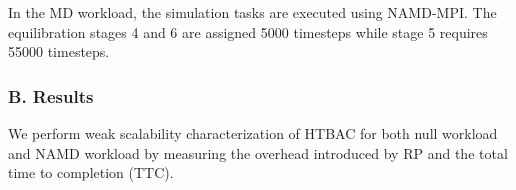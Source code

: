 In the MD workload, the simulation tasks are executed using NAMD-MPI. The equilibration stages 4 and 6 are assigned 5000 timesteps while stage 5 requires 55000 timesteps. 

\subsubsection{B. Results}

We perform weak scalability characterization of HTBAC for both null workload and NAMD workload by measuring the overhead introduced by RP and the total time to completion (TTC). 



